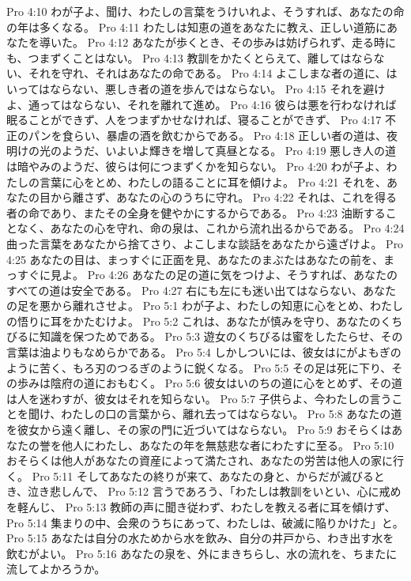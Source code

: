 Pro 4:10  わが子よ、聞け、わたしの言葉をうけいれよ、そうすれば、あなたの命の年は多くなる。
Pro 4:11  わたしは知恵の道をあなたに教え、正しい道筋にあなたを導いた。
Pro 4:12  あなたが歩くとき、その歩みは妨げられず、走る時にも、つまずくことはない。
Pro 4:13  教訓をかたくとらえて、離してはならない、それを守れ、それはあなたの命である。
Pro 4:14  よこしまな者の道に、はいってはならない、悪しき者の道を歩んではならない。
Pro 4:15  それを避けよ、通ってはならない、それを離れて進め。
Pro 4:16  彼らは悪を行わなければ眠ることができず、人をつまずかせなければ、寝ることができず、
Pro 4:17  不正のパンを食らい、暴虐の酒を飲むからである。
Pro 4:18  正しい者の道は、夜明けの光のようだ、いよいよ輝きを増して真昼となる。
Pro 4:19  悪しき人の道は暗やみのようだ、彼らは何につまずくかを知らない。
Pro 4:20  わが子よ、わたしの言葉に心をとめ、わたしの語ることに耳を傾けよ。
Pro 4:21  それを、あなたの目から離さず、あなたの心のうちに守れ。
Pro 4:22  それは、これを得る者の命であり、またその全身を健やかにするからである。
Pro 4:23  油断することなく、あなたの心を守れ、命の泉は、これから流れ出るからである。
Pro 4:24  曲った言葉をあなたから捨てさり、よこしまな談話をあなたから遠ざけよ。
Pro 4:25  あなたの目は、まっすぐに正面を見、あなたのまぶたはあなたの前を、まっすぐに見よ。
Pro 4:26  あなたの足の道に気をつけよ、そうすれば、あなたのすべての道は安全である。
Pro 4:27  右にも左にも迷い出てはならない、あなたの足を悪から離れさせよ。
Pro 5:1  わが子よ、わたしの知恵に心をとめ、わたしの悟りに耳をかたむけよ。
Pro 5:2  これは、あなたが慎みを守り、あなたのくちびるに知識を保つためである。
Pro 5:3  遊女のくちびるは蜜をしたたらせ、その言葉は油よりもなめらかである。
Pro 5:4  しかしついには、彼女はにがよもぎのように苦く、もろ刃のつるぎのように鋭くなる。
Pro 5:5  その足は死に下り、その歩みは陰府の道におもむく。
Pro 5:6  彼女はいのちの道に心をとめず、その道は人を迷わすが、彼女はそれを知らない。
Pro 5:7  子供らよ、今わたしの言うことを聞け、わたしの口の言葉から、離れ去ってはならない。
Pro 5:8  あなたの道を彼女から遠く離し、その家の門に近づいてはならない。
Pro 5:9  おそらくはあなたの誉を他人にわたし、あなたの年を無慈悲な者にわたすに至る。
Pro 5:10  おそらくは他人があなたの資産によって満たされ、あなたの労苦は他人の家に行く。
Pro 5:11  そしてあなたの終りが来て、あなたの身と、からだが滅びるとき、泣き悲しんで、
Pro 5:12  言うであろう、「わたしは教訓をいとい、心に戒めを軽んじ、
Pro 5:13  教師の声に聞き従わず、わたしを教える者に耳を傾けず、
Pro 5:14  集まりの中、会衆のうちにあって、わたしは、破滅に陥りかけた」と。
Pro 5:15  あなたは自分の水ためから水を飲み、自分の井戸から、わき出す水を飲むがよい。
Pro 5:16  あなたの泉を、外にまきちらし、水の流れを、ちまたに流してよかろうか。
